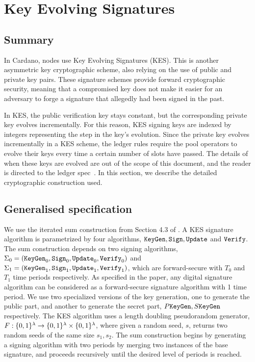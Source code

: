 \section{Key Evolving Signatures}
\label{sec:kes}

\subsection{Summary}
In Cardano, nodes use Key Evolving Signatures (KES).
This is another asymmetric key cryptographic scheme, also relying on
the use of public and private key pairs.
These signature schemes provide forward cryptographic security, meaning that a
compromised key does not make it easier for an adversary to forge a signature that
allegedly had been signed in the past.

In KES, the public verification key stays constant, but the
corresponding private key evolves incrementally. For this reason, KES
signing keys are indexed by integers representing the step in the key's
evolution. Since the private key evolves incrementally in a KES scheme, the ledger rules
require the pool operators to evolve their keys every time a certain number of
slots have passed. The details of when these keys are evolved are out of the
scope of this document, and the reader is directed to the ledger spec~\cite{ledgerspec}.
In this section, we describe the detailed cryptographic construction used.

\subsection{Generalised specification}
\newcommand{\update}{\texttt{Update}}
\newcommand{\pkeygen}{P\keygen}
\newcommand{\skeygen}{S\keygen}
\newcommand{\derive}{\texttt{DeriveVerKey}}
\newcommand{\prf}{F}
\newcommand{\seed}{r}
\newcommand{\accept}{\texttt{true}}
\newcommand{\reject}{\texttt{false}}
\newcommand{\nodename}[1]{\fbox{#1}}
We use the iterated sum construction from Section 4.3 of \cite{cryptoeprint:2001:034}.
A KES signature algorithm is parametrized by four algorithms, $\keygen, \sign, \update$ and $\texttt{Verify}$. The sum
construction depends on two signing algorithms, $\Sigma_0 = (\keygen_0, \sign_0, \allowbreak\update_0, \verify_0)$
and $\Sigma_1 = (\keygen_1, \sign_1, \update_1, \verify_1)$, which are forward-secure with $T_0$ and $T_1$ time
periods respectively. As specified in the paper, any digital signature algorithm can be considered as a
forward-secure signature algorithm with 1 time period.
We use two specialized versions of the key generation, one to generate the public
part, and another to generate the secret part, $\pkeygen, \skeygen$ respectively. The KES algorithm
uses a length doubling pseudorandom generator, $\prf:\{0,1\}^{\secparam}\rightarrow\{0,1\}^{\secparam}\times\{0,
1\}^{\secparam}$, where given a random seed, $s$, returns two random seeds of the same size $s_1, s_2$. The sum
construction begins by generating a signing algorithm with two periods by merging two instances of the base signature,
and proceeds recursively until the desired level of periods is reached.

